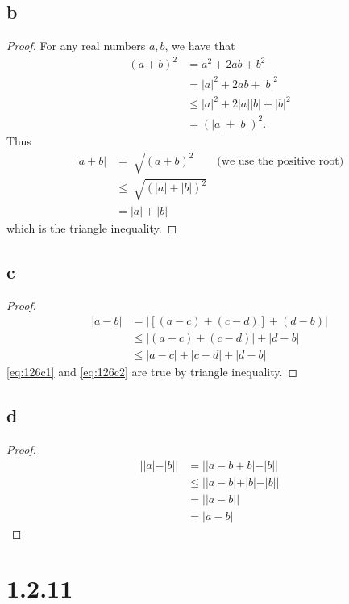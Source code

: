 \documentclass[10pt]{article}
\begin{document}
\subsection*{b}
\begin{proof}
    For any real numbers $a,b$, we have that
    \begin{align*}
        (a+b)^2 &= a^2 + 2ab + b^2\\
        &= |a|^2 + 2ab + |b|^2\\
        &\le |a|^2 + 2|a||b| + |b|^2\\
        &= (|a|+|b|)^2.
    \end{align*}
    Thus
    \begin{align*}
        |a+b| &= \sqrt[]{(a+b)^2}\qquad \text{(we use the positive root)}\\
        &\le \sqrt[]{(|a|+|b|)^2}\\
        &= |a|+|b|
    \end{align*}
    which is the triangle inequality.
\end{proof}


\subsection*{c}
\begin{proof}
    \begin{align}
        |a-b| &= |[(a-c) + (c-d)] + (d-b)| \nonumber\\
        &\le |(a-c) + (c-d)| + |d-b| \label{eq:126c1}\\
        &\le |a-c| + |c-d| + |d-b| \label{eq:126c2}
    \end{align}
    \eqref{eq:126c1} and \eqref{eq:126c2} are true by triangle inequality.
\end{proof}
\subsection*{d}
\begin{proof}
    \begin{align*}
        ||a|-|b|| &= ||a-b+b|-|b||\\
        &\le ||a-b| + |b| - |b||\\
        &= ||a-b||\\
        &= |a-b|
    \end{align*}
\end{proof}

\section*{1.2.11}
\end{document}
